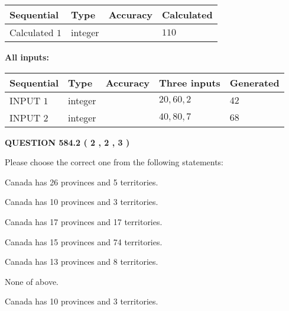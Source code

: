 \documentclass[12pt]{article}
\begin{document}
   
  
  
\noindent\begin{tabular}{|l|l|l|l|}
\hline
 Sequential & Type & Accuracy & Calculated \\ 
\hline
 
 
  Calculated $  1 $ & integer &  & 
  $ 110 $ 
 \\  \hline  
 \end{tabular}
   
   
   
   
\noindent\vspace{0.1in}\hspace{-0.08in} {\textbf{\Large{All inputs: }}}
   
   
  
  
\noindent\begin{tabular}{|l|l|l|l|l|}
\hline
 Sequential & Type & Accuracy & Three inputs & Generated \\ 
\hline
 
 
  INPUT $  1 $ & integer &  & $
 20
 , 
 60
 , 
 2
 $ & $ 42 $ 
 \\  \hline  
 
 
  INPUT $  2 $ & integer &  & $
 40
 , 
 80
 , 
 7
 $ & $ 68 $ 
 \\  \hline  
 \end{tabular}
   
   
  
\vspace{0.2in}
  
{\textbf{\Large{QUESTION
584.2 
 ( 2 , 2 , 3 )
}}}
  
  
Please choose the correct one from the following statements:
 
 
Canada has  26 provinces and  5 territories.
 
 
Canada has 10  provinces and 3 territories.
 
 
Canada has  17 provinces and  17 territories.
 
 
Canada has  15 provinces and  74 territories.
 
 
Canada has  13 provinces and  8 territories.
 
 
 None of above.
 
 
\noindent{}
 
 
Canada has 10  provinces and 3 territories.
 
\end{document}
